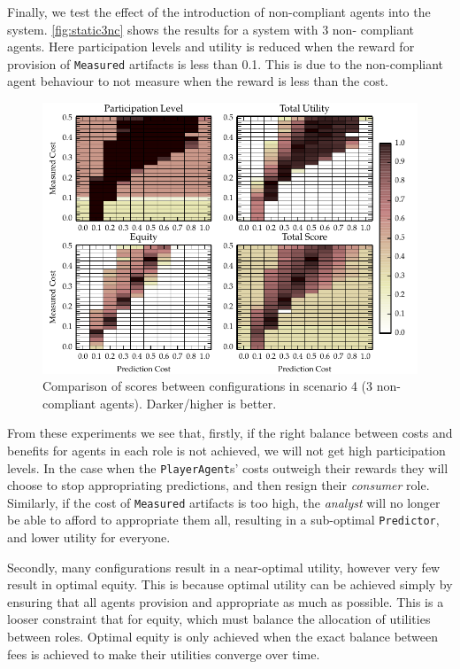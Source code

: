 Finally, we test the effect of the introduction of non-compliant agents into
the system. \autoref{fig:static3nc} shows the results for a system with 3 non-
compliant agents. Here participation levels and utility is reduced when the
reward for provision of \texttt{Measured} artifacts is less than 0.1. This is
due to the non-compliant agent behaviour to not measure when the reward is
less than the cost.

\begin{figure}
\includegraphics{gfx/kc/static_1_3nc.pdf} 
\caption[Comparison of scores between configurations in scenario 4 (3 non-compliant agents).]{Comparison of scores between configurations in scenario 4 (3 non-compliant agents). Darker/higher is better.}\label{fig:static3nc}
\end{figure}

From these experiments we see that, firstly, if the right balance between
costs and benefits for agents in each role is not achieved, we will not get
high participation levels. In the case when the \texttt{PlayerAgent}s' costs
outweigh their rewards they will choose to stop appropriating predictions, and
then resign their \emph{consumer} role. Similarly, if the cost of
\texttt{Measured} artifacts is too high, the \emph{analyst} will no longer be
able to afford to appropriate them all, resulting in a sub-optimal
\texttt{Predictor}, and lower utility for everyone.

Secondly, many configurations result in a near-optimal utility, however very
few result in optimal equity. This is because optimal utility can be achieved
simply by ensuring that all agents provision and appropriate as much as
possible. This is a looser constraint that for equity, which must balance the
allocation of utilities between roles. Optimal equity is only achieved when
the exact balance between fees is achieved to make their utilities converge
over time.

